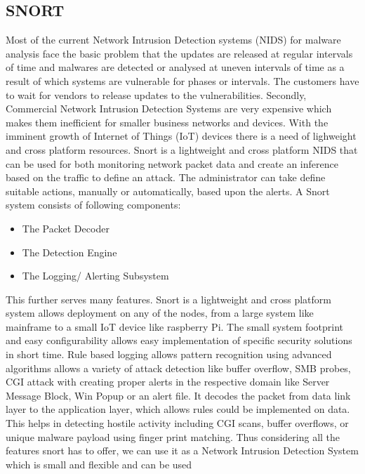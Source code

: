 \documentclass[11pt]{article}
\begin{document}
	\subsection{SNORT}
	Most of the current Network Intrusion Detection systems (NIDS) for malware analysis face the basic problem that the updates are released at regular intervals of time and malwares are detected or analysed at uneven intervals of time as a result of which systems are vulnerable for phases or intervals. The customers have to wait for vendors to release updates to the vulnerabilities. Secondly, Commercial Network Intrusion Detection Systems are very expensive which makes them inefficient for smaller business networks and devices. With the imminent growth of Internet of Things (IoT) devices there is a need of lighweight and cross platform resources.
	Snort is a lightweight and cross platform NIDS that can be used for both monitoring network packet data and create an inference based on the traffic to define an attack. The administrator can take define suitable actions, manually or automatically, based upon the alerts.
	A Snort system consists of following components:
	\begin{itemize}
		\item The Packet Decoder
		\item The Detection Engine
		\item The Logging/ Alerting Subsystem
	\end{itemize}
	This further serves many features. Snort is a lightweight and cross platform system allows deployment on any of the nodes, from a large system like mainframe to a small IoT device like raspberry Pi. The small system footprint and easy configurability allows easy implementation of specific security solutions in short time. Rule based logging allows pattern recognition using advanced algorithms allows a variety of attack detection like buffer overflow, SMB probes, CGI attack with creating proper alerts in the respective domain like Server Message Block, Win Popup or an alert file. It decodes the packet from data link layer to the application layer, which allows rules could be implemented on data. This helps in detecting hostile activity including CGI scans, buffer overflows, or unique malware payload using finger print matching.
	Thus considering all the features snort has to offer, we can use it as a Network Intrusion Detection System which is small and flexible and can be used
	
\end{document}
